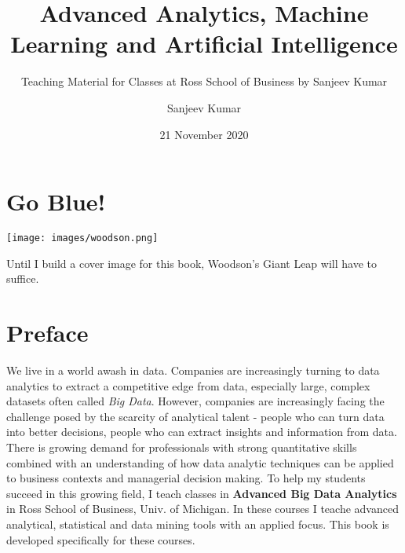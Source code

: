 \documentclass[
]{krantz}
\title{Advanced Analytics, Machine Learning and Artificial Intelligence}
\subtitle{Teaching Material for Classes at Ross School of Business by Sanjeev Kumar}
\author{Sanjeev Kumar}
\date{21 November 2020}
\renewenvironment{quote}{\begin{VF}}{\end{VF}}
\begin{document}
\maketitle


\thispagestyle{empty}

\begin{center}

\par{}

\end{center}

\setlength{\abovedisplayskip}{-5pt}
\setlength{\abovedisplayshortskip}{-5pt}

{
\hypersetup{linkcolor=}
\setcounter{tocdepth}{2}
\tableofcontents
}
\listoftables
\listoffigures
\hypertarget{go-blue}{%
\chapter*{Go Blue!}\label{go-blue}}


\texttt{[image: images/woodson.png]}

\begin{quote}
Until I build a cover image for this book, Woodson's Giant Leap will have to suffice.
\end{quote}

\hypertarget{preface}{%
\chapter*{Preface}\label{preface}}


We live in a world awash in data. Companies are increasingly turning to data analytics to
extract a competitive edge from data, especially large, complex datasets often called \emph{Big
Data}. However, companies are increasingly facing the challenge posed by the scarcity of
analytical talent - people who can turn data into better decisions, people who can extract
insights and information from data. There is growing demand for professionals with strong
quantitative skills combined with an understanding of how data analytic techniques can be
applied to business contexts and managerial decision making. To help my students succeed in
this growing field, I teach classes in \textbf{Advanced Big Data Analytics} in Ross School of Business, Univ. of Michigan. In these courses I teache advanced analytical, statistical and data mining tools with an applied focus. This book is developed specifically for these courses.
\end{document}
